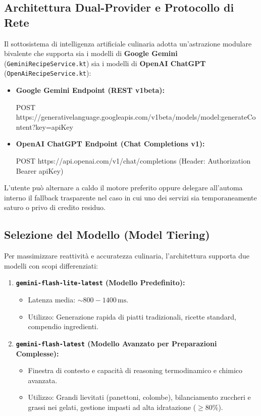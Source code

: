 \documentclass[11pt,a4paper,titlepage]{article}
\begin{document}
\subsection{Architettura Dual-Provider e Protocollo di Rete}
Il sottosistema di intelligenza artificiale culinaria adotta un'astrazione modulare bivalente che supporta sia i modelli di \textbf{Google Gemini} (\texttt{GeminiRecipeService.kt}) sia i modelli di \textbf{OpenAI ChatGPT} (\texttt{OpenAiRecipeService.kt}):
\begin{itemize}[leftmargin=*]
    \item \textbf{Google Gemini Endpoint (REST v1beta):}
    \begin{center}
    \small\ttfamily
    POST https://generativelanguage.googleapis.com/v1beta/models/{model}:generateContent?key={apiKey}
    \end{center}
    \item \textbf{OpenAI ChatGPT Endpoint (Chat Completions v1):}
    \begin{center}
    \small\ttfamily
    POST https://api.openai.com/v1/chat/completions (Header: Authorization Bearer {apiKey})
    \end{center}
\end{itemize}
L'utente pu\`o alternare a caldo il motore preferito oppure delegare all'automa interno il fallback trasparente nel caso in cui uno dei servizi sia temporaneamente saturo o privo di credito residuo.

\subsection{Selezione del Modello (Model Tiering)}
Per massimizzare reattivit\`a e accuratezza culinaria, l'architettura supporta due modelli con scopi differenziati:
\begin{enumerate}
    \item \textbf{\texttt{gemini-flash-lite-latest} (Modello Predefinito):}
    \begin{itemize}[noitemsep]
        \item Latenza media: $\sim 800 - 1400\,\text{ms}$.
        \item Utilizzo: Generazione rapida di piatti tradizionali, ricette standard, compendio ingredienti.
    \end{itemize}
    \item \textbf{\texttt{gemini-flash-latest} (Modello Avanzato per Preparazioni Complesse):}
    \begin{itemize}[noitemsep]
        \item Finestra di contesto e capacit\`a di reasoning termodinamico e chimico avanzata.
        \item Utilizzo: Grandi lievitati (panettoni, colombe), bilanciamento zuccheri e grassi nei gelati, gestione impasti ad alta idratazione ($\ge 80\%$).
    \end{itemize}
\end{enumerate}
\end{document}
